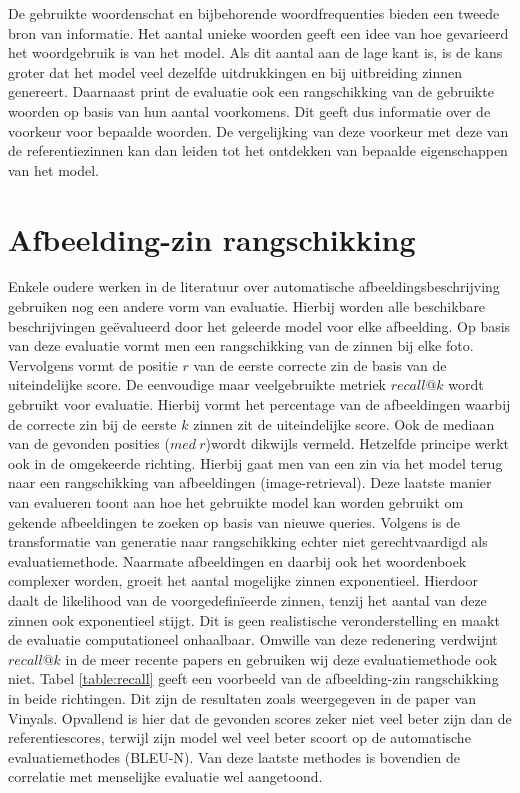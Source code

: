 De gebruikte woordenschat en bijbehorende woordfrequenties bieden een tweede bron van informatie. Het aantal unieke woorden geeft een idee van hoe gevarieerd het woordgebruik is van het model. Als dit aantal aan de lage kant is, is de kans groter dat het model veel dezelfde uitdrukkingen en bij uitbreiding zinnen genereert. Daarnaast print de evaluatie ook een rangschikking van de gebruikte woorden op basis van hun aantal voorkomens. Dit geeft dus informatie over de voorkeur voor bepaalde woorden. De vergelijking van deze voorkeur met deze van de referentiezinnen kan dan leiden tot het ontdekken van bepaalde eigenschappen van het model.

\section{Afbeelding-zin rangschikking}
Enkele oudere werken in de literatuur over automatische afbeeldingsbeschrijving gebruiken nog een andere vorm van evaluatie. Hierbij worden alle beschikbare beschrijvingen ge\"evalueerd door het geleerde model voor elke afbeelding. Op basis van deze evaluatie vormt men een rangschikking van de zinnen bij elke foto. Vervolgens vormt de positie $r$ van de eerste correcte zin de basis van de uiteindelijke score.  De eenvoudige maar veelgebruikte metriek $recall @ k$ wordt gebruikt voor evaluatie. Hierbij vormt het percentage van de afbeeldingen waarbij de correcte zin bij de eerste $k$ zinnen zit de uiteindelijke score. Ook de mediaan van de gevonden posities ($med\: r$)wordt dikwijls vermeld. Hetzelfde principe werkt ook in de omgekeerde richting. Hierbij gaat men van een zin via het model terug naar een rangschikking van afbeeldingen (image-retrieval). Deze laatste manier van evalueren toont aan hoe het gebruikte model kan worden gebruikt om gekende afbeeldingen te zoeken op basis van nieuwe queries. 
Volgens  is de transformatie van generatie naar rangschikking echter niet gerechtvaardigd als evaluatiemethode. Naarmate afbeeldingen en daarbij ook het woordenboek complexer worden, groeit het aantal mogelijke zinnen exponentieel. Hierdoor daalt de likelihood van de voorgedefin\"ieerde zinnen, tenzij het aantal van deze zinnen ook exponentieel stijgt. Dit is geen realistische veronderstelling en maakt de evaluatie computationeel onhaalbaar. Omwille van deze redenering verdwijnt $recall @ k$ in de meer recente papers en gebruiken wij deze evaluatiemethode ook niet. Tabel \ref{table:recall} geeft een voorbeeld van de afbeelding-zin rangschikking in beide richtingen. Dit zijn de resultaten zoals weergegeven in de paper van Vinyals. Opvallend is hier dat de gevonden scores zeker niet veel beter zijn dan de referentiescores, terwijl zijn model wel veel beter scoort op de automatische evaluatiemethodes (BLEU-N). Van deze laatste methodes is bovendien de correlatie met menselijke evaluatie wel aangetoond.


